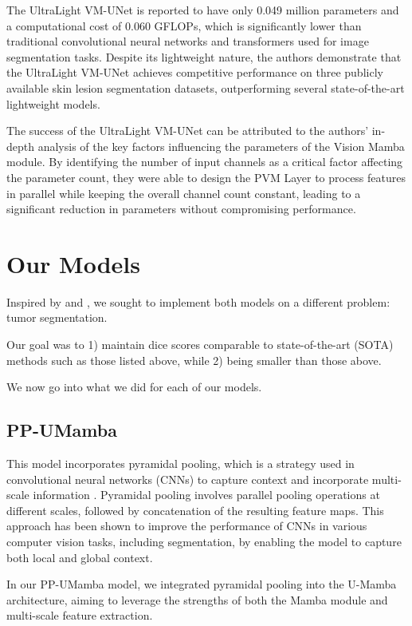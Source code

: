 \documentclass[conference]{IEEEtran}
\begin{document}
The UltraLight VM-UNet is reported to have only 0.049 million parameters and a computational cost of 0.060 GFLOPs, which is significantly lower than traditional convolutional neural networks and transformers used for image segmentation tasks. Despite its lightweight nature, the authors demonstrate that the UltraLight VM-UNet achieves competitive performance on three publicly available skin lesion segmentation datasets, outperforming several state-of-the-art lightweight models.

The success of the UltraLight VM-UNet can be attributed to the authors' in-depth analysis of the key factors influencing the parameters of the Vision Mamba module. By identifying the number of input channels as a critical factor affecting the parameter count, they were able to design the PVM Layer to process features in parallel while keeping the overall channel count constant, leading to a significant reduction in parameters without compromising performance.

\section{Our Models}

Inspired by \cite{U-Mamba} and \cite{ultralightvmunet}, we sought to implement both models on a different problem: tumor segmentation.

Our goal was to 1) maintain dice scores comparable to state-of-the-art (SOTA) methods such as those listed above, while 2) being smaller than those above.

We now go into what we did for each of our models.


\subsection{PP-UMamba}
This model incorporates pyramidal pooling, which is a strategy used in convolutional neural networks (CNNs) to capture context and incorporate multi-scale information \cite{zhao2017pyramid}. Pyramidal pooling involves parallel pooling operations at different scales, followed by concatenation of the resulting feature maps. This approach has been shown to improve the performance of CNNs in various computer vision tasks, including segmentation, by enabling the model to capture both local and global context.

In our PP-UMamba model, we integrated pyramidal pooling into the U-Mamba architecture, aiming to leverage the strengths of both the Mamba module and multi-scale feature extraction.
\end{document}
